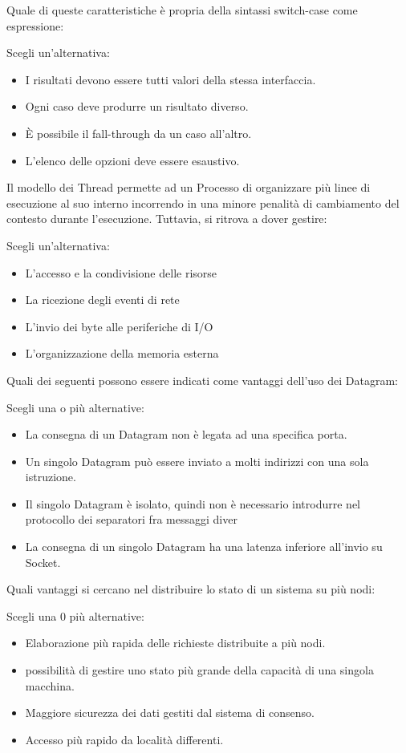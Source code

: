 \documentclass{article}
\begin{document}
Quale di queste caratteristiche è propria della sintassi switch-case come espressione:

Scegli un'alternativa: 
\begin{itemize}
	\item I risultati devono essere tutti valori della stessa interfaccia.
	\item Ogni caso deve produrre un risultato diverso.
	\item È possibile il fall-through da un caso all'altro.
	\item \checkmark L'elenco delle opzioni deve essere esaustivo. 
\end{itemize}


Il modello dei Thread permette ad un Processo di organizzare più linee di esecuzione al suo interno incorrendo in una minore penalità di cambiamento del contesto
durante l'esecuzione. Tuttavia, si ritrova a dover gestire:

Scegli un'alternativa: 

\begin{itemize}
	\item \checkmark L'accesso e la condivisione delle risorse
	\item La ricezione degli eventi di rete
	\item L'invio dei byte alle periferiche di I/O
	\item L'organizzazione della memoria esterna
\end{itemize}

Quali dei seguenti possono essere indicati come vantaggi dell'uso dei Datagram:

Scegli una o più alternative:
\begin{itemize}
	\item La consegna di un Datagram non è legata ad una specifica porta.
	\item \checkmark Un singolo Datagram può essere inviato a molti indirizzi con una sola istruzione.
	\item \checkmark Il singolo Datagram è isolato, quindi non è necessario introdurre nel protocollo dei separatori fra messaggi diver
	\item La consegna di un singolo Datagram ha una latenza inferiore all'invio su Socket.
\end{itemize}

Quali vantaggi si cercano nel distribuire lo stato di un sistema su più nodi:

Scegli una 0 più alternative:
\begin{itemize}
	\item Elaborazione più rapida delle richieste distribuite a più nodi.
	\item \checkmark possibilità di gestire uno stato più grande della capacità di una singola macchina.
	\item Maggiore sicurezza dei dati gestiti dal sistema di consenso.
	\item \checkmark Accesso più rapido da località differenti. 
\end{itemize}
\end{document}
